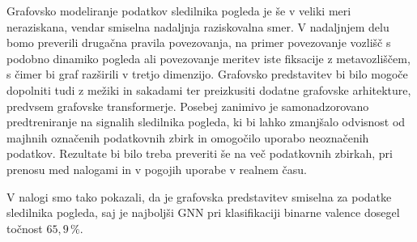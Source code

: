 Grafovsko modeliranje podatkov sledilnika pogleda je še v veliki meri neraziskana, vendar smiselna nadaljnja raziskovalna smer.
V nadaljnjem delu bomo preverili drugačna pravila povezovanja, na primer povezovanje vozlišč s podobno dinamiko pogleda ali povezovanje meritev iste fiksacije z metavozliščem, s čimer bi graf razširili v tretjo dimenzijo.
Grafovsko predstavitev bi bilo mogoče dopolniti tudi z mežiki in sakadami ter preizkusiti dodatne grafovske arhitekture, predvsem grafovske transformerje.
Posebej zanimivo je samonadzorovano predtreniranje na signalih sledilnika pogleda, ki bi lahko zmanjšalo odvisnost od majhnih označenih podatkovnih zbirk in omogočilo uporabo neoznačenih podatkov.
Rezultate bi bilo treba preveriti še na več podatkovnih zbirkah, pri prenosu med nalogami in v pogojih uporabe v realnem času.

V nalogi smo tako pokazali, da je grafovska predstavitev smiselna za podatke sledilnika pogleda, saj je najboljši GNN pri klasifikaciji binarne valence dosegel točnost $65{,}9\,\%$.
